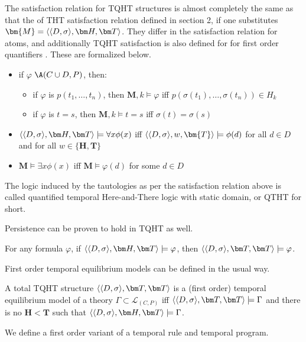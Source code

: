 The satisfaction relation for TQHT structures is almost completely the
same as that the of THT satisfaction relation defined in section 2, if
one substitutes $\bm{M}=\qthandt$. They differ in the satisfaction
relation for atoms, and additionally TQHT satisfaction is also defined
for for first order quantifiers \cite{agcapevidi17a}. These are
formalized below.

\begin{itemize}
  \item if $\varphi$ \in $\A(C \cup D,P)$, then:
    \begin{itemize}
    \item if $\varphi$ is $p(t_1,\dots,t_n)$, then $\bm{M},k \models \varphi$ iff $p(\sigma(t_1), \dots, \sigma(t_n))\in H_k$
    \item if $\varphi$ is $t = s$, then  $\bm{M},k \models t = s$ iff $\sigma(t) = \sigma(s)$
    \end{itemize}
  \item $\qthandt \models \forall x \phi(x)$ iff $\langle \dsigma, w,\bm{T} \rangle \models \phi(d)$ for all $d \in D$ and for all $w \in \{\bm{H}, \bm{T}\}$ 
  \item $\bm{M} \models \exists x \phi(x)$ iff $\bm{M} \models \varphi(d)$ for some $d \in D$
\end{itemize}

The logic induced by the tautologies as per the satisfaction relation
above is called quantified temporal Here-and-There logic with static
domain, or QTHT for short.

Persistence can be proven to hold in TQHT as well.

\begin{proposition}
  For any formula $\varphi$, if $\qthandt \models \varphi$, then
  $\qttandt \models \varphi$.
\end{proposition}

First order temporal equilibrium models can be defined in the usual way.

\begin{definition}
  A total TQHT structure $\qttandt$ is a (first order) temporal
  equilibrium model of a theory
  $\Gamma \subset \mathcal{L}_{(C,P)}$ iff
  $\qttandt \models \Gamma$ and there is no $\bm{H} < \bm{T}$ such
  that $\qthandt \models \Gamma$.
\end{definition}

We define a first order variant of a temporal rule and temporal program.

